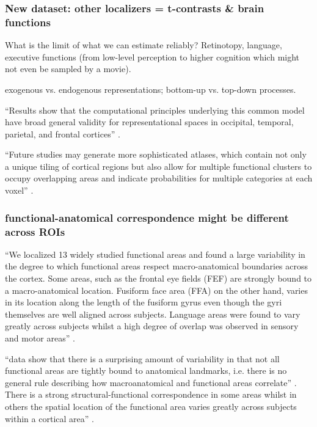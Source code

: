 \subsubsection{New dataset: other localizers = t-contrasts \& brain functions}

What is the limit of what we can estimate reliably?
%
Retinotopy, language, executive functions (from low-level perception to higher
cognition which might not even be sampled by a movie).

%
exogenous vs. endogenous representations; bottom-up vs. top-down processes.


``Results show that the computational principles underlying this common
model have broad general validity for representational spaces in occipital,
temporal, parietal, and frontal cortices'' \citep{guntupalli2016model}.

``Future studies may generate more sophisticated atlases, which contain not only
a unique tiling of cortical regions but also allow for multiple functional
clusters to occupy overlapping areas and indicate probabilities for multiple
categories at each voxel'' \citep{rosenke2021probabilistic}.


\subsubsection {functional-anatomical correspondence might be different across
ROIs}


``We localized 13 widely studied functional areas and found a large variability
in the degree to which functional areas respect macro-anatomical boundaries
across the cortex.
%
Some areas, such as the frontal eye fields (FEF) are strongly bound to a
macro-anatomical location.
%
Fusiform face area (FFA) on the other hand, varies in its location along the
length of the fusiform gyrus even though the gyri themselves are well aligned
across subjects.
%
Language areas were found to vary greatly across subjects whilst a high degree
of overlap was observed in sensory and motor areas'' \citep{frost2012measuring}.

``data show that there is a surprising amount of variability in that not all
functional areas are tightly bound to anatomical landmarks, i.e. there is no
general rule describing how macroanatomical and functional areas correlate''
\citep{frost2012measuring}.
%
There is a strong structural-functional correspondence in some areas whilst in
others the spatial location of the functional area varies greatly across
subjects within a cortical area'' \citep{frost2012measuring}.

